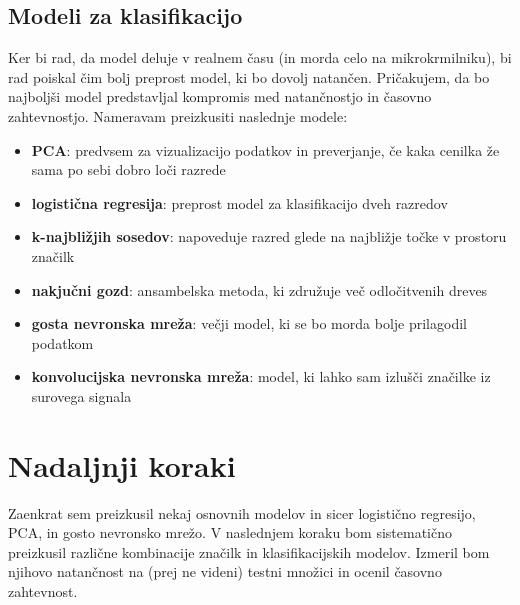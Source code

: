 \documentclass[11pt,a4paper]{article}
\begin{document}
\subsection{Modeli za klasifikacijo}
Ker bi rad, da model deluje v realnem času (in morda celo na mikrokrmilniku), bi rad poiskal čim bolj preprost model, ki bo dovolj natančen. Pričakujem, da bo najboljši model predstavljal kompromis med natančnostjo in časovno zahtevnostjo. Nameravam preizkusiti naslednje modele:
\begin{itemize}
    \item \textbf{PCA}: predvsem za vizualizacijo podatkov in preverjanje, če kaka cenilka že sama po sebi dobro loči razrede
    \item \textbf{logistična regresija}: preprost model za klasifikacijo dveh razredov
    \item \textbf{k-najbližjih sosedov}: napoveduje razred glede na najbližje točke v prostoru značilk
    \item \textbf{nakjučni gozd}: ansambelska metoda, ki združuje več odločitvenih dreves
    \item \textbf{gosta nevronska mreža}: večji model, ki se bo morda bolje prilagodil podatkom
    \item \textbf{konvolucijska nevronska mreža}: model, ki lahko sam izlušči značilke iz surovega signala
\end{itemize}
\section{Nadaljnji koraki}
Zaenkrat sem preizkusil nekaj osnovnih modelov in sicer logistično regresijo, PCA, in gosto nevronsko mrežo. V naslednjem koraku bom sistematično preizkusil različne kombinacije značilk in klasifikacijskih modelov. Izmeril bom njihovo natančnost na (prej ne videni) testni množici in ocenil časovno zahtevnost.


\renewcommand\refname{Literatura}

\end{document}
